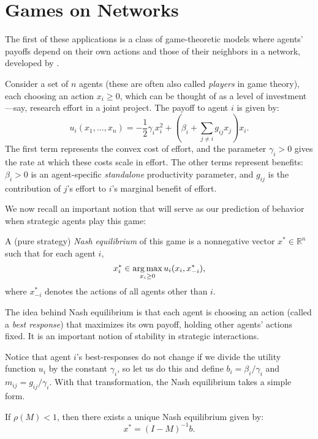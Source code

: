\documentclass{notices}
\theoremstyle{definition}\newtheorem{problem}{Problem}
\begin{document}
\section*{Games on Networks}

The first of these applications is a class of game-theoretic models where agents' payoffs depend on their own actions and those of their neighbors in a network, developed by \cite{Ballesteretal2006}.

Consider a set of $n$ agents (these are often also called \emph{players} in game theory), each choosing an action $x_i \geq 0$, which can be thought of as a level of investment—say, research effort in a joint project. The payoff to agent $i$ is given by:
\begin{equation}
u_i(x_1, \ldots, x_n) = -\frac{1}{2} \gamma_i x_i^2 +  \left( \beta_i + \sum_{j \neq i} g_{ij} x_j \right)x_i.
\label{eq:network_game_payoff}
\end{equation}
The first term represents the convex cost of effort, and the parameter $\gamma_i>0$ gives the rate at which these costs scale in effort. The other terms represent benefits: $\beta_i > 0$ is an agent-specific \emph{standalone} productivity parameter, and $g_{ij}$ is the contribution of $j$'s effort to $i$'s marginal benefit of effort.

We now recall  an important notion that will serve as our prediction of behavior when strategic agents play this game:
\begin{definition}
A (pure strategy) \emph{Nash equilibrium} of this game is a nonnegative vector $x^* \in \mathbb{R}^n$ such that for each agent $i$,
$$
x_i^* \in \argmax_{x_i \geq 0} u_i(x_i, x_{-i}^*),
$$
where $x_{-i}^*$ denotes the actions of all agents other than $i$.
\end{definition}

The idea behind Nash equilibrium is that each agent is choosing an action (called a \emph{best response}) that maximizes its own payoff, holding other agents' actions fixed.  It is an important notion of stability in strategic interactions. 

Notice that agent $i$'s best-responses do not change if we divide the utility function $u_i$ by the constant $\gamma_i$, so let us do this and define $b_i = \beta_i/\gamma_i$ and $m_{ij} = g_{ij}/\gamma_i$. With that transformation, the Nash equilibrium takes a simple form.

\begin{fact} \label{fact:Nash}
If $\rho(M) < 1$, then there exists a unique Nash equilibrium given by:
\begin{equation} \label{eq:Nash}
x^* = (I - M)^{-1} b.
\end{equation}
\end{fact}
\end{document}
